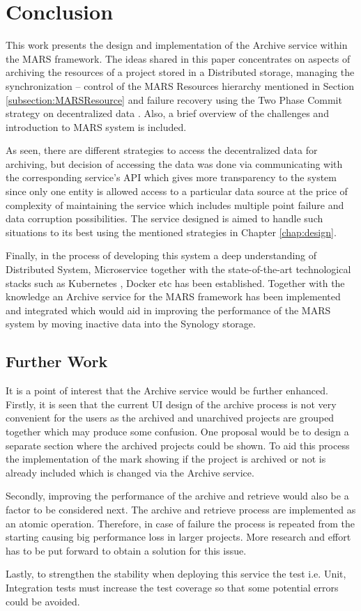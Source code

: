 \chapter{Conclusion}
This work presents the design and implementation of the Archive service within the MARS framework. The ideas shared
in this paper concentrates on aspects of archiving the resources of a project stored in a Distributed storage, managing the synchronization
-- control of the MARS Resources hierarchy mentioned in Section \ref{subsection:MARSResource} and failure recovery using the Two Phase Commit strategy
on decentralized data \cite{atomic}.
Also, a brief overview of the challenges and introduction to MARS system is included.

As seen, there are different strategies to access the decentralized data for archiving, but decision of accessing the data was done via communicating
with the corresponding service's API which gives more transparency to the system since only one entity is allowed access to a particular data source at the price of 
complexity of maintaining the service which includes multiple point failure and data corruption possibilities. The service designed is aimed to handle such situations
to its best using the mentioned strategies in Chapter \ref{chap:design}.

Finally, in the process of developing this system a deep understanding of Distributed System, Microservice together with the state-of-the-art technological stacks
such as Kubernetes \cite{kubernetes}, Docker etc has been established. Together with the knowledge an Archive service for the MARS framework has been implemented and integrated which
would aid in improving the performance of the MARS system by moving inactive data into the Synology storage.

\section{Further Work}
It is a point of interest that the Archive service would be further enhanced. Firstly, it is seen that the current UI design of the archive process is not very convenient
for the users as the archived and unarchived projects are grouped together which may produce some confusion. One proposal would be to design a separate section
where the archived projects could be shown. To aid this process the implementation of the mark showing if the project is archived or not is already included which is
changed via the Archive service. 

Secondly, improving the performance of the archive and retrieve would also be a factor to be considered next. The archive and retrieve process are implemented as
an atomic operation. Therefore, in case of failure the process is repeated from the starting causing big performance loss in larger projects. More research and effort
has to be put forward to obtain a solution for this issue. 

Lastly, to strengthen the stability when deploying this service the test i.e. Unit, Integration tests must increase the test coverage so that some potential
errors could be avoided. 


